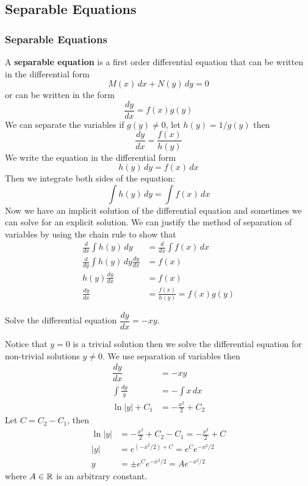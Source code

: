 \subsection{Separable Equations}

\subsubsection*{Separable Equations}
A \textbf{separable equation} is a first order differential equation that can
be written in the differential form
\[M(x)\,dx+N(y)\,dy=0\]
or can be written in the form
\[\frac{dy}{dx}=f(x)g(y)\]
We can separate the variables if \(g(y)\neq0\), let \(h(y)=1/g(y)\) then
\[\frac{dy}{dx}=\frac{f(x)}{h(y)}\]
We write the equation in the differential form
\[h(y)\,dy=f(x)\,dx\]
Then we integrate both sides of the equation:
\[\int h(y)\,dy=\int f(x)\,dx\]
Now we have an implicit solution of the differential equation and sometimes we
can solve for an explicit solution.
We can justify the method of separation of variables by using the chain rule
to show that
\begin{align*}
    \frac{d}{dx}\int h(y)\,dy &= \frac{d}{dx}\int f(x)\,dx \\
    \frac{d}{dy}\int h(y)\,dy\frac{dy}{dx} &= f(x) \\
    h(y)\frac{dy}{dx} &= f(x) \\
    \frac{dy}{dx} &= \frac{f(x)}{h(y)}=f(x)g(y)
\end{align*}
\begin{problem}
    Solve the differential equation \(\dfrac{dy}{dx}=-xy\).
\end{problem}
\begin{solution}
    Notice that \(y=0\) is a trivial solution then we solve the differential
    equation for non-trivial solutions \(y\neq 0\).
    We use separation of variables then
    \begin{align*}
        \dfrac{dy}{dx} &= -xy \\
        \int\frac{dy}{y} &= -\int x\,dx \\
        \ln |y|+C_1 &= -\frac{x^2}{2}+C_2
    \end{align*}
    Let \(C=C_2-C_1\), then
    \begin{align*}
        \ln |y| &= -\frac{x^2}{2}+C_2-C_1=-\frac{x^2}{2}+C \\
        |y| &= e^{(-x^2/2)+C}=e^Ce^{-x^2/2} \\
        y &= \pm e^Ce^{-x^2/2}=Ae^{-x^2/2}
    \end{align*}
    where \(A\in\mathbb{R}\) is an arbitrary constant.
\end{solution}
